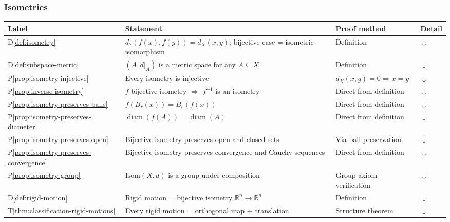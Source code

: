 \subsubsection{Isometries}
\label{sec:isometries}

\begin{tcolorbox}[colback=gray!6, colframe=gray!40, arc=2pt,
  left=6pt, right=6pt, top=4pt, bottom=4pt,
  title={\small\textbf{Isometries --- Quick Reference}},
  fonttitle=\small\bfseries]
\small
\begin{tabular}{l l l l}
\toprule
\textbf{Label} & \textbf{Statement} & \textbf{Proof method} & \textbf{Detail} \\
\midrule
D\ref{def:isometry}
  & $d_Y(f(x),f(y)) = d_X(x,y)$; bijective case = isometric isomorphism
  & Definition
  & \hyperref[def:isometry]{$\downarrow$} \\
D\ref{def:subspace-metric}
  & $(A, d|_A)$ is a metric space for any $A \subseteq X$
  & Definition
  & \hyperref[def:subspace-metric]{$\downarrow$} \\
P\ref{prop:isometry-injective}
  & Every isometry is injective
  & $d_X(x,y)=0 \Rightarrow x=y$
  & \hyperref[prop:isometry-injective]{$\downarrow$} \\
P\ref{prop:inverse-isometry}
  & $f$ bijective isometry $\Rightarrow$ $f^{-1}$ is an isometry
  & Direct from definition
  & \hyperref[prop:inverse-isometry]{$\downarrow$} \\
P\ref{prop:isometry-preserves-balls}
  & $f(B_r(x)) = B_r(f(x))$
  & Direct from definition
  & \hyperref[prop:isometry-preserves-balls]{$\downarrow$} \\
P\ref{prop:isometry-preserves-diameter}
  & $\operatorname{diam}(f(A)) = \operatorname{diam}(A)$
  & Direct from definition
  & \hyperref[prop:isometry-preserves-diameter]{$\downarrow$} \\
P\ref{prop:isometry-preserves-open}
  & Bijective isometry preserves open and closed sets
  & Via ball preservation
  & \hyperref[prop:isometry-preserves-open]{$\downarrow$} \\
P\ref{prop:isometry-preserves-convergence}
  & Bijective isometry preserves convergence and Cauchy sequences
  & Direct from definition
  & \hyperref[prop:isometry-preserves-convergence]{$\downarrow$} \\
P\ref{prop:isometry-group}
  & $\mathrm{Isom}(X,d)$ is a group under composition
  & Group axiom verification
  & \hyperref[prop:isometry-group]{$\downarrow$} \\
D\ref{def:rigid-motion}
  & Rigid motion = bijective isometry $\mathbb{R}^n \to \mathbb{R}^n$
  & Definition
  & \hyperref[def:rigid-motion]{$\downarrow$} \\
T\ref{thm:classification-rigid-motions}
  & Every rigid motion = orthogonal map $+$ translation
  & Structure theorem
  & \hyperref[thm:classification-rigid-motions]{$\downarrow$} \\
\bottomrule
\end{tabular}
\end{tcolorbox}

